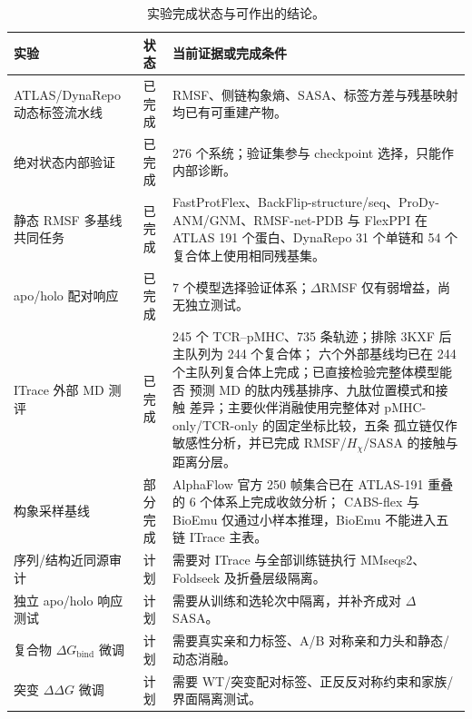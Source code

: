 
\begin{table}[!ht]
  \centering
  \caption{实验完成状态与可作出的结论。}
  \label{tab:experiment-status}
  \small
  \begin{tabularx}{\textwidth}{
    >{\raggedright\arraybackslash}p{3.2cm}
    >{\raggedright\arraybackslash}p{1.5cm}
    X}
    \toprule
    实验 & 状态 & 当前证据或完成条件 \\
    \midrule
    ATLAS/\allowbreak DynaRepo 动态标签流水线 & 已完成 &
      RMSF、侧链构象熵、SASA、标签方差与残基映射均已有可重建产物。\\
    绝对状态内部验证 & 已完成 &
      276 个系统；验证集参与 checkpoint 选择，只能作内部诊断。\\
    静态 RMSF 多基线共同任务 & 已完成 &
      FastProtFlex、BackFlip-structure/seq、ProDy-ANM/GNM、RMSF-net-PDB 与 FlexPPI 在
      ATLAS 191 个蛋白、DynaRepo 31 个单链和 54 个复合体上使用相同残基集。\\
    apo/holo 配对响应 & 已完成 &
      7 个模型选择验证体系；$\Delta$RMSF 仅有弱增益，尚无独立测试。\\
    ITrace 外部 MD 测评 & 已完成 &
      245 个 TCR--pMHC、735 条轨迹；排除 3KXF 后主队列为 244 个复合体；
      六个外部基线均已在 244 个主队列复合体上完成；已直接检验完整体模型能否
      预测 MD 的肽内残基排序、九肽位置模式和接触
      差异；主要伙伴消融使用完整体对 pMHC-only/TCR-only 的固定坐标比较，五条
      孤立链仅作敏感性分析，并已完成 RMSF/$H_\chi$/SASA 的接触与距离分层。\\
    构象采样基线 & 部分完成 &
      AlphaFlow 官方 250 帧集合已在 ATLAS-191 重叠的 6 个体系上完成收敛分析；
      CABS-flex 与 BioEmu 仅通过小样本推理，BioEmu 不能进入五链 ITrace 主表。\\
    序列/结构近同源审计 & 计划 &
      需要对 ITrace 与全部训练链执行 MMseqs2、Foldseek 及折叠层级隔离。\\
    独立 apo/holo 响应测试 & 计划 &
      需要从训练和选轮次中隔离，并补齐成对 $\Delta$SASA。\\
    复合物 $\Delta G_{\mathrm{bind}}$ 微调 & 计划 &
      需要真实亲和力标签、A/B 对称亲和力头和静态/动态消融。\\
    突变 $\Delta\Delta G$ 微调 & 计划 &
      需要 WT/突变配对标签、正反反对称约束和家族/界面隔离测试。\\
    \bottomrule
  \end{tabularx}
\end{table}
